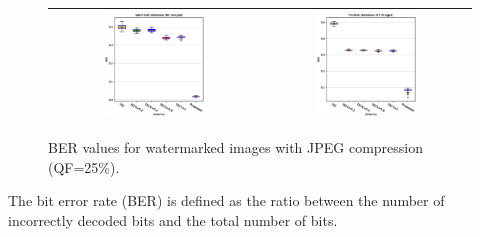 \documentclass[runningheads]{llncs}
\begin{document}
\begin{figure}[H]
	\begin{center}
		\begin{tabular}{|c|c|}\hline
			\includegraphics[width=0.5\textwidth]{BER25SaintGall.eps}
			&\includegraphics[width=0.5\textwidth]{BER25Parzival.eps}\\\hline
		\end{tabular}
	\end{center}
	\caption{BER values for watermarked images with JPEG compression (QF=25\%).}
	\label{ber25}
\end{figure}

The bit error rate (BER) is defined as the ratio between the number of incorrectly decoded bits and the total number of bits.
\end{document}
